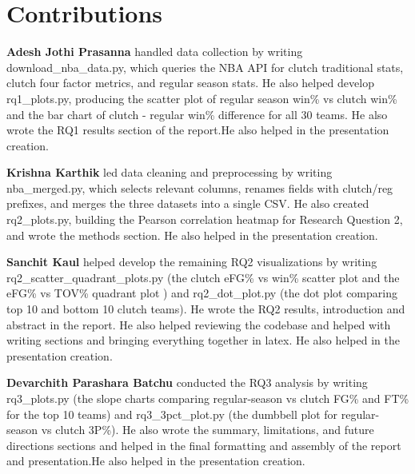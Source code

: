 \newpage
\section*{Contributions}

\begin{sloppypar}
\textbf{Adesh Jothi Prasanna} handled data collection by writing download\_nba\_data.py, which queries the NBA API for 
clutch traditional stats, clutch four factor metrics, and regular season stats. He 
also helped develop rq1\_plots.py, producing the scatter plot of regular season win\% vs clutch win\% and the bar chart of 
clutch - regular win\% difference for all 30 teams. He also wrote the RQ1 results section of the report.He also helped in the presentation creation.

\textbf{Krishna Karthik} led data cleaning and preprocessing by writing nba\_merged.py, which selects relevant columns, 
renames fields with clutch/reg prefixes, and merges the three datasets into a single  CSV. He also created 
rq2\_plots.py, building the Pearson correlation heatmap for Research Question 2, 
and wrote the methods section. He also helped in the presentation creation.

\textbf{Sanchit Kaul} helped develop the remaining RQ2 visualizations by writing rq2\_scatter\_quadrant\_plots.py (the 
clutch eFG\% vs win\% scatter plot and the eFG\% vs TOV\% quadrant plot ) and rq2\_dot\_plot.py 
(the dot plot comparing top 10 and bottom 10 clutch teams). He wrote the RQ2 results, 
introduction and abstract in the report. He also helped reviewing the codebase and helped with writing sections and 
bringing everything together in latex. He also helped in the presentation creation.

\textbf{Devarchith Parashara Batchu} conducted the RQ3 analysis by writing rq3\_plots.py (the slope charts comparing 
regular-season vs clutch FG\% and FT\% for the top 10 teams) and rq3\_3pct\_plot.py (the dumbbell plot for 
regular-season vs clutch 3P\%). He also wrote the summary, limitations, and future directions sections and 
helped in the final formatting and assembly of the report and presentation.He also helped in the presentation creation.
\end{sloppypar}
\newpage
